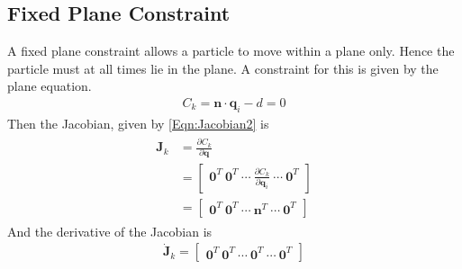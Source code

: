 \subsection{Fixed Plane Constraint}
\label{SubSec:FixedPlaneConstraint}
A fixed plane constraint allows a particle to move within a plane only. Hence
the particle must at all times lie in the plane. A constraint for this is given
by the plane equation.
\begin{eqnarray}
	\label{Eqn:FixedPlaneConstraint}
	C_k = \mathbf{n}\cdot\mathbf{q}_i - d = 0
\end{eqnarray}
Then the Jacobian, given by \ref{Eqn:Jacobian2} is
\begin{eqnarray}
	\label{Eqn:JacobianFixedPlaneConstraint}
    \begin{split}
	\mathbf{J}_k & = \frac{\partial C_k}{\partial \mathbf{q}} \\ 
    & =  
	\begin{bmatrix}
		\mathbf{0}^T \: \mathbf{0}^T \: \cdots \: \frac{\partial
		C_k}{\partial \mathbf{q}_i} \: \cdots \: \mathbf{0}^T
	\end{bmatrix} \\
    & = 
	\begin{bmatrix}
		\mathbf{0}^T \: \mathbf{0}^T \: \cdots \:
		\mathbf{n}^T \: \cdots \: \mathbf{0}^T
	\end{bmatrix}
    \end{split}
\end{eqnarray}
And the derivative of the Jacobian is
\begin{eqnarray}
	\label{Eqn:DJacobianFixedPlaneConstraint}
	\dot{\mathbf{J}}_k = 
	\begin{bmatrix}
		\mathbf{0}^T \: \mathbf{0}^T \: \cdots \:
		\mathbf{0}^T \: \cdots \: \mathbf{0}^T	
	\end{bmatrix}
\end{eqnarray}

